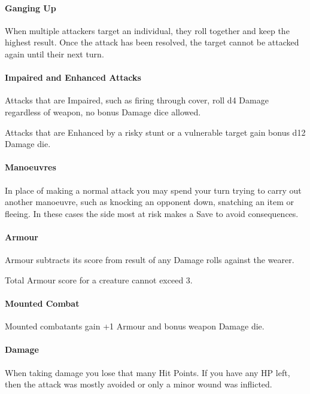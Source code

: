 \documentclass[itdr]{subfiles}
\begin{document}
\paragraph{Ganging Up}
When multiple attackers target an individual, they roll together and keep the highest result. Once the attack has been resolved, the target cannot be attacked again until their next turn.

\paragraph{Impaired and Enhanced Attacks}
Attacks that are Impaired, such as firing through cover, roll d4 Damage regardless of weapon, no bonus Damage dice allowed.

Attacks that are Enhanced by a risky stunt or a vulnerable target gain bonus d12 Damage die.

\paragraph{Manoeuvres}
In place of making a normal attack you may spend your turn trying to carry out another manoeuvre, such as knocking an opponent down, snatching an item or fleeing. In these cases the side most at risk makes a Save to avoid consequences.

\paragraph{Armour}
Armour subtracts its score from result of any Damage rolls against the wearer.

Total Armour score for a creature cannot exceed 3.

\paragraph{Mounted Combat}
Mounted combatants gain +1 Armour and bonus weapon Damage die.

\paragraph{Damage}
When taking damage you lose that many Hit Points. If you have any HP left, then the attack was mostly avoided or only a minor wound was inflicted.
\end{document}
